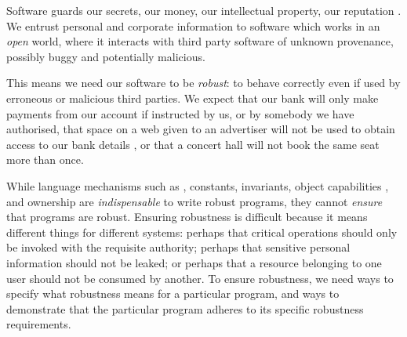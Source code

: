 Software guards our secrets, our money, our intellectual property,
our reputation \cite{covern}.  We entrust personal and
corporate information to software which works in an \emph{open} world, 
where  it interacts with 
third party software of unknown provenance, possibly buggy and potentially malicious.

This means we need our software to be \emph{robust}:
to behave correctly even if  used 
by erroneous or malicious third parties.
We expect that our bank will only make payments 
from our account if instructed by us, or by somebody we have authorised, 
that space on a web given to an advertiser will not be used
to obtain access to our bank details \cite{cwe}, or that a
concert hall will not book the same seat more than once.



While language mechanisms such as ,  constants, invariants, 
object capabilities \cite{MillerPhD}, and 
ownership \cite{ownalias} are
\textit{indispensable} to write robust
programs, they cannot \textit{ensure} that programs are robust.
Ensuring robustness is difficult because it means 
different things for different systems: perhaps
that critical operations should only be invoked with the requisite authority;
perhaps that sensitive personal information should not be leaked; 
or perhaps that a resource belonging to one user should not be consumed by another. 
%
To ensure robustness, we need ways to specify what robustness means for a 
particular program, and ways to demonstrate that the particular program 
adheres to its specific robustness requirements.


